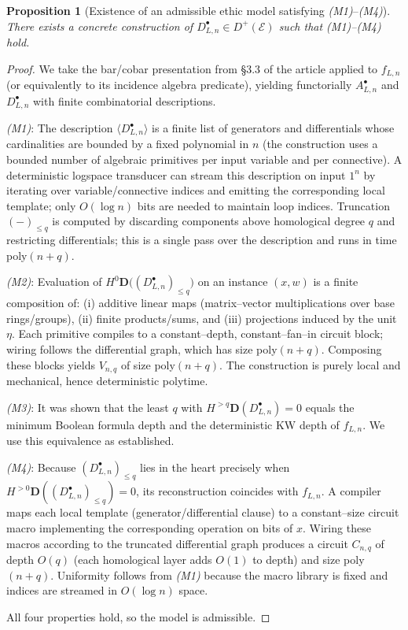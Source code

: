 \documentclass[12pt]{article}
\newcommand{\HD}[2]{H^{#1}\mathbf D(#2)} %
\newcommand{\E}{\mathcal{E}}
\newcommand{\Dplus}{D^{+}}
\theoremstyle{plain}
\newtheorem{proposition}[theorem]{Proposition}
\theoremstyle{definition}
\theoremstyle{remark}
\numberwithin{equation}{section}
\begin{document}
\begin{proposition}[Existence of an admissible ethic model satisfying \emph{(M1)}–\emph{(M4)}]\label{prop:existence}
There exists a concrete construction of \(D_{L,n}^{\bullet}\in\Dplus(\E)\) such that \emph{(M1)}–\emph{(M4)} hold.
\end{proposition}

\begin{proof}
We take the bar/cobar presentation from §3.3 of the article applied to \(f_{L,n}\) (or equivalently to its incidence algebra predicate), yielding functorially \(A_{L,n}^{\bullet}\) and \(D_{L,n}^{\bullet}\) with finite combinatorial descriptions.

\emph{(M1)}:
The description \(\langle D_{L,n}^{\bullet}\rangle\) is a finite list of generators and differentials whose cardinalities are bounded by a fixed polynomial in \(n\) (the construction uses a bounded number of algebraic primitives per input variable and per connective).
A deterministic logspace transducer can stream this description on input \(1^{n}\) by iterating over variable/connective indices and emitting the corresponding local template; only \(O(\log n)\) bits are needed to maintain loop indices.
Truncation \((-)_{\le q}\) is computed by discarding components above homological degree \(q\) and restricting differentials; this is a single pass over the description and runs in time poly\((n+q)\).

\emph{(M2)}:
Evaluation of \(H^{0}\mathbf D\big((D_{L,n}^{\bullet})_{\le q}\big)\) on an instance \((x,w)\) is a finite composition of: (i) additive linear maps (matrix–vector multiplications over base rings/groups), (ii) finite products/sums, and (iii) projections induced by the unit \(\eta\).
Each primitive compiles to a constant–depth, constant–fan–in circuit block; wiring follows the differential graph, which has size poly\((n+q)\).
Composing these blocks yields \(V_{n,q}\) of size poly\((n+q)\).
The construction is purely local and mechanical, hence deterministic polytime.

\emph{(M3)}:
It was shown that the least \(q\) with \(H^{>q}\mathbf D(D_{L,n}^{\bullet})=0\) equals the minimum Boolean formula depth and the deterministic KW depth of \(f_{L,n}\).
We use this equivalence as established.

\emph{(M4)}:
Because \((D_{L,n}^{\bullet})_{\le q}\) lies in the heart precisely when \(\HD{>0}{(D_{L,n}^{\bullet})_{\le q}}=0\), its reconstruction coincides with \(f_{L,n}\).
A compiler maps each local template (generator/differential clause) to a constant–size circuit macro implementing the corresponding operation on bits of \(x\).
Wiring these macros according to the truncated differential graph produces a circuit \(C_{n,q}\) of depth \(O(q)\) (each homological layer adds \(O(1)\) to depth) and size poly\((n+q)\).
Uniformity follows from \emph{(M1)} because the macro library is fixed and indices are streamed in \(O(\log n)\) space.

All four properties hold, so the model is admissible.
\end{proof}
\end{document}
